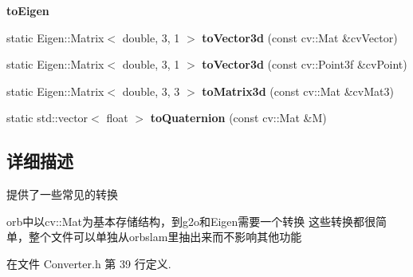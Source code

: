 \begin{Indent}{\bf to\-Eigen}\par
\begin{DoxyCompactItemize}
\item 
\hypertarget{classORB__SLAM2_1_1Converter_a65fccab585e29d1acbf4c23e5ce69bdc}{static Eigen\-::\-Matrix$<$ double, 3, 1 $>$ {\bfseries to\-Vector3d} (const cv\-::\-Mat \&cv\-Vector)}\label{classORB__SLAM2_1_1Converter_a65fccab585e29d1acbf4c23e5ce69bdc}

\item 
\hypertarget{classORB__SLAM2_1_1Converter_af7b71b64b74fd45b39b9a7f47ee80145}{static Eigen\-::\-Matrix$<$ double, 3, 1 $>$ {\bfseries to\-Vector3d} (const cv\-::\-Point3f \&cv\-Point)}\label{classORB__SLAM2_1_1Converter_af7b71b64b74fd45b39b9a7f47ee80145}

\item 
\hypertarget{classORB__SLAM2_1_1Converter_a000a7971e46afdc95d6692a70006182b}{static Eigen\-::\-Matrix$<$ double, 3, 3 $>$ {\bfseries to\-Matrix3d} (const cv\-::\-Mat \&cv\-Mat3)}\label{classORB__SLAM2_1_1Converter_a000a7971e46afdc95d6692a70006182b}

\item 
\hypertarget{classORB__SLAM2_1_1Converter_a16b54bd921d9cdc83d289cfd1598fb3c}{static std\-::vector$<$ float $>$ {\bfseries to\-Quaternion} (const cv\-::\-Mat \&M)}\label{classORB__SLAM2_1_1Converter_a16b54bd921d9cdc83d289cfd1598fb3c}

\end{DoxyCompactItemize}
\end{Indent}


\subsection{详细描述}
提供了一些常见的转换 

orb中以cv\-::\-Mat为基本存储结构，到g2o和\-Eigen需要一个转换 这些转换都很简单，整个文件可以单独从orbslam里抽出来而不影响其他功能 

在文件 Converter.\-h 第 39 行定义.



